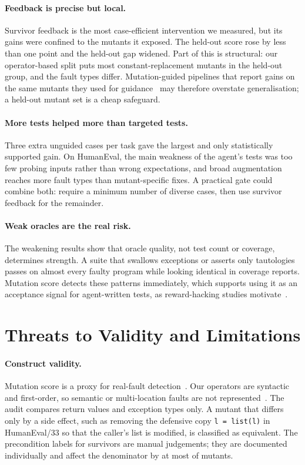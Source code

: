 \documentclass[runningheads]{llncs}
\begin{document}
\paragraph{Feedback is precise but local.} Survivor feedback is the most case-efficient intervention we measured, but its gains were confined to the mutants it exposed. The held-out score rose by less than one point and the held-out gap widened. Part of this is structural: our operator-based split puts most constant-replacement mutants in the held-out group, and the fault types differ. Mutation-guided pipelines that report gains on the same mutants they used for guidance~\cite{wang2025mutgen,chang2026advertest} may therefore overstate generalisation; a held-out mutant set is a cheap safeguard.

\paragraph{More tests helped more than targeted tests.} Three extra unguided cases per task gave the largest and only statistically supported gain. On HumanEval, the main weakness of the agent's tests was too few probing inputs rather than wrong expectations, and broad augmentation reaches more fault types than mutant-specific fixes. A practical gate could combine both: require a minimum number of diverse cases, then use survivor feedback for the remainder.

\paragraph{Weak oracles are the real risk.} The weakening results show that oracle quality, not test count or coverage, determines strength. A suite that swallows exceptions or asserts only tautologies passes on almost every faulty program while looking identical in coverage reports. Mutation score detects these patterns immediately, which supports using it as an acceptance signal for agent-written tests, as reward-hacking studies motivate~\cite{gabor2025evilgenie,zhao2026specbench}.

\section{Threats to Validity and Limitations}\label{sec:threats}

\paragraph{Construct validity.} Mutation score is a proxy for real-fault detection~\cite{just2014mutants}. Our operators are syntactic and first-order, so semantic or multi-location faults are not represented~\cite{hort2025semantic}. The audit compares return values and exception types only. A mutant that differs only by a side effect, such as removing the defensive copy \texttt{l = list(l)} in HumanEval/33 so that the caller's list is modified, is classified as equivalent. The precondition labels for \nEqPre{} survivors are manual judgements; they are documented individually and affect the denominator by at most \nEqPre{} of \nKillable{} mutants.
\end{document}
